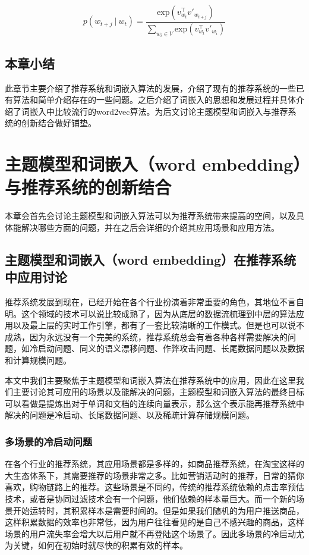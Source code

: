 \begin{equation}
p(w_{t+j} \: | \: w_t ) = \dfrac{\text{exp}({v^\top_{w_t} v'_{w_{t+j}}})}{\sum_{w_i \in V} \text{exp}({v^\top_{w_t} v'_{w_i}})}	
\end{equation}
\section{本章小结}
此章节主要介绍了推荐系统和词嵌入算法的发展，介绍了现有的推荐系统的一些已有算法和简单介绍存在的一些问题。之后介绍了词嵌入的思想和发展过程并具体介绍了词嵌入中比较流行的word2vec算法。为后文讨论主题模型和词嵌入与推荐系统的创新结合做好铺垫。
\chapter{主题模型和词嵌入（word embedding）与推荐系统的创新结合}
本章会首先会讨论主题模型和词嵌入算法可以为推荐系统带来提高的空间，以及具体能解决哪些方面的问题，并在之后会详细的介绍其应用场景和应用方法。
\section{主题模型和词嵌入（word embedding）在推荐系统中应用讨论}
推荐系统发展到现在，已经开始在各个行业扮演着非常重要的角色，其地位不言自明。这个领域的技术可以说比较成熟了，因为从底层的数据流梳理到中层的算法应用以及最上层的实时工作引擎，都有了一套比较清晰的工作模式。但是也可以说不成熟，因为永远没有一个完美的系统，推荐系统总会有着各种各样需要解决的问题，如冷启动问题\cite{Schafer2007}、同义的语义漂移问题\cite{synonymy}、作弊攻击问题\cite{shillingattacks}、长尾数据问题\cite{Longtail}以及数据和计算规模问题。

本文中我们主要聚焦于主题模型和词嵌入算法在推荐系统中的应用，因此在这里我们主要讨论其可应用的场景以及能解决的问题，主题模型和词嵌入算法的最终目标可以看做是提炼出对于单词和文档的连续向量表示，那么这个表示能再推荐系统中解决的问题是冷启动、长尾数据问题、以及稀疏计算存储规模问题。

\subsection{多场景的冷启动问题}
在各个行业的推荐系统，其应用场景都是多样的，如商品推荐系统，在淘宝这样的大生态体系下，其需要推荐的场景非常之多。比如营销活动时的推荐，日常的猜你喜欢，购物链路上的推荐。这些场景是不同的，传统的推荐系统依赖的点击率预估技术，或者是协同过滤技术会有一个问题，他们依赖的样本量巨大。而一个新的场景开始运转时，其积累样本是需要时间的。但是如果我们随机的为用户推送商品，这样积累数据的效率也非常低，因为用户往往看见的是自己不感兴趣的商品，这样场景的用户流失率会增大以后用户就不再登陆这个场景了。因此多场景的冷启动尤为关键，如何在初始时就尽快的积累有效的样本。

